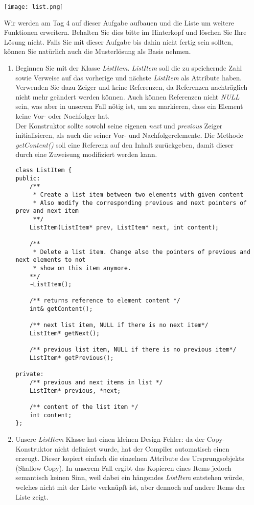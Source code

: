 \documentclass[
  accentcolor=tud1c,	%
  colorbacktitle,		%
  inverttitle,			%
  german,				%
  twoside
]{tudexercise}
\begin{document}
\texttt{[image: list.png]}

Wir werden am Tag 4 auf dieser Aufgabe aufbauen und die Liste um weitere Funktionen erweitern. Behalten Sie dies bitte im Hinterkopf und löschen Sie Ihre Lösung nicht. Falls Sie mit dieser Aufgabe bis dahin nicht fertig sein sollten, können Sie natürlich auch die Musterlösung als Basis nehmen.

\begin{enumerate}
\item Beginnen Sie mit der Klasse \emph{ListItem}. \emph{ListItem} soll die zu speichernde Zahl sowie Verweise auf das vorherige und nächste \emph{ListItem} als Attribute haben. Verwenden Sie dazu Zeiger und keine Referenzen, da Referenzen nachträglich nicht mehr geändert werden können. Auch können Referenzen nicht \emph{NULL} sein, was aber in unserem Fall nötig ist, um zu markieren, dass ein Element keine Vor- oder Nachfolger hat. \\

Der Konstruktor sollte sowohl seine eigenen \emph{next} und \emph{previous} Zeiger initialisieren, als auch die seiner Vor- und Nachfolgerelemente. 
Die Methode \emph{getContent()} soll eine Referenz auf den Inhalt zurückgeben, damit dieser durch eine Zuweisung modifiziert werden kann.

\begin{lstlisting}
class ListItem {
public:
	/** 
	 * Create a list item between two elements with given content 
	 * Also modify the corresponding previous and next pointers of prev and next item
	 **/
	ListItem(ListItem* prev, ListItem* next, int content);

	/** 
	 * Delete a list item. Change also the pointers of previous and next elements to not
	 * show on this item anymore.
	**/
	~ListItem();

	/** returns reference to element content */
	int& getContent();

	/** next list item, NULL if there is no next item*/
	ListItem* getNext();

	/** previous list item, NULL if there is no previous item*/
	ListItem* getPrevious();

private:
	/** previous and next items in list */
	ListItem* previous, *next;

	/** content of the list item */
	int content;
};
\end{lstlisting}

\item Unsere \emph{ListItem} Klasse hat einen kleinen Design-Fehler: da der Copy-Konstruktor nicht definiert wurde, hat der Compiler automatisch einen erzeugt. Dieser kopiert einfach die einzelnen Attribute des Ursprungsobjekts (Shallow Copy). In unserem Fall ergibt das Kopieren eines Items jedoch semantisch keinen Sinn, weil dabei ein hängendes \emph{ListItem} entstehen würde, welches nicht mit der Liste verknüpft ist, aber dennoch auf andere Items der Liste zeigt. 


\end{enumerate}
\end{document}
